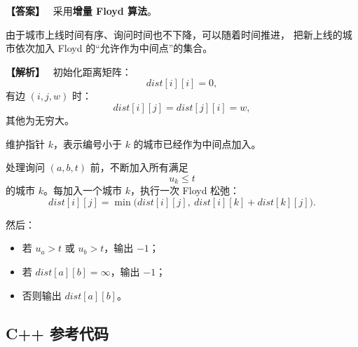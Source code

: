 \documentclass[12pt,a4paper]{ctexart}
\newenvironment{solution}
{\par\noindent\textbf{\color{answerblue}【解析】}\ }
{\par}
\newenvironment{answer}
{\par\noindent\textbf{\color{darkgreen}【答案】}\ }
{\par}
\begin{document}
\begin{answer}
采用\textbf{增量 Floyd 算法}。

由于城市上线时间有序、询问时间也不下降，可以随着时间推进，
把新上线的城市依次加入 Floyd 的“允许作为中间点”的集合。
\end{answer}

\begin{solution}
初始化距离矩阵：
\[
dist[i][i]=0,
\]
有边 $(i,j,w)$ 时：
\[
dist[i][j]=dist[j][i]=w,
\]
其他为无穷大。

维护指针 $k$，表示编号小于 $k$ 的城市已经作为中间点加入。

处理询问 $(a,b,t)$ 前，不断加入所有满足
\[
u_k\le t
\]
的城市 $k$。每加入一个城市 $k$，执行一次 Floyd 松弛：
\[
dist[i][j]
=
\min\bigl(dist[i][j],\ dist[i][k]+dist[k][j]\bigr).
\]

然后：
\begin{itemize}
  \item 若 $u_a>t$ 或 $u_b>t$，输出 $-1$；
  \item 若 $dist[a][b]=\infty$，输出 $-1$；
  \item 否则输出 $dist[a][b]$。
\end{itemize}
\end{solution}

\subsection*{C++ 参考代码}
\end{document}
